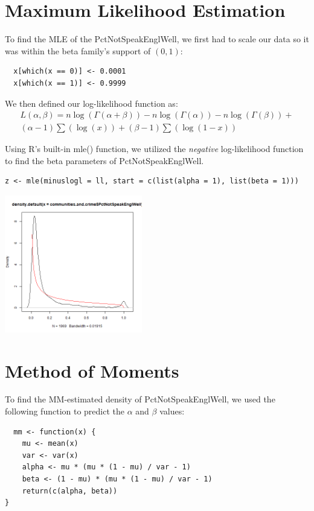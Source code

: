 \documentclass[12pt, letterpaper]{report}
\begin{document}
\pagebreak
\section{Maximum Likelihood Estimation}
To find the MLE of the PctNotSpeakEnglWell, we first had to scale our data so it was within the beta family's support of $(0, 1)$: 
\begin{lstlisting}
  x[which(x == 0)] <- 0.0001  
  x[which(x == 1)] <- 0.9999
\end{lstlisting} 

We then defined our log-likelihood function as:
\begin{multline}
L(\alpha, \beta) = n \log{(\Gamma(\alpha+\beta))} - n \log{(\Gamma(\alpha))} - n \log{(\Gamma(\beta))} + \\
(\alpha - 1) \sum(\log(x)) + (\beta-1) \sum(\log{(1-x)})
\end{multline}

Using R's built-in mle() function, we utilized the \textit{negative} log-likelihood function to find the beta parameters of PctNotSpeakEnglWell.
\begin{lstlisting}
z <- mle(minuslogl = ll, start = c(list(alpha = 1), list(beta = 1)))
\end{lstlisting} 

\begin{center}
\includegraphics[width=0.45\textwidth]{beta/PctNotSpeakEnglWell_mle}
\end{center}

\pagebreak
\section{Method of Moments}
To find the MM-estimated density of PctNotSpeakEnglWell, we used the following function to predict the $\alpha$ and $\beta$ values:
\begin{lstlisting}
  mm <- function(x) {
    mu <- mean(x)
    var <- var(x)
    alpha <- mu * (mu * (1 - mu) / var - 1)
    beta <- (1 - mu) * (mu * (1 - mu) / var - 1)
    return(c(alpha, beta))
}
\end{lstlisting} 
\end{document}
